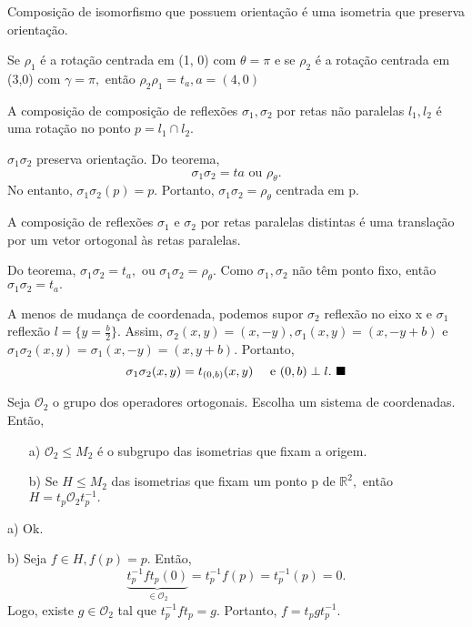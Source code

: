 \documentclass[Algebra/algebra_notes.tex]{subfiles}
\begin{document}
\begin{proof*}
	Composição de isomorfismo que possuem orientação é uma isometria que preserva orientação.
\end{proof*}
\begin{example*}
	Se $\rho _{1}$ é a rotação centrada em (1, 0) com $\theta = \pi $ e se $\rho _{2}$ é a rotação centrada em (3,0) com
	$\gamma =\pi ,$ então $\rho _{2}\rho _{1}=t_{a}, a = (4, 0)$ \qedsymbol
\end{example*}
\begin{crl*}
	A composição de composição de reflexões $\sigma _{1}, \sigma _{2}$ por retas não paralelas $l_{1}, l_{2}$ é uma rotação no ponto
	$p=l_{1}\cap l_{2}.$
\end{crl*}
\begin{proof*}
	$\sigma_{1}\sigma _{2}$ preserva orientação. Do teorema,
	$$
		\sigma _{1}\sigma _{2} = ta\text{ ou } \rho _{\theta }.
	$$
	No entanto, $\sigma _{1}\sigma _{2}(p) = p.$ Portanto, $\sigma _{1}\sigma _{2} = \rho _{\theta }$ centrada em p. \qedsymbol
\end{proof*}
\begin{crl*}
	A composição de reflexões $\sigma _{1}$ e $\sigma _{2}$ por retas paralelas distintas é uma translação por um vetor ortogonal
	às retas paralelas.
\end{crl*}
\begin{proof*}
	Do teorema, $\sigma _{1}\sigma _{2} = t_{a},$ ou $\sigma _{1}\sigma _{2} = \rho _{\theta }.$ Como $\sigma _{1}, \sigma _{2}$
	não têm ponto fixo, então $\sigma _{1}\sigma _{2} = t_{a}.$

	A menos de mudança de coordenada, podemos supor $\sigma _{2}$ reflexão no eixo x e $\sigma _{1}$ reflexão $l=\{y=\frac{b}{2}\}.$ Assim,
	$\sigma _{2}(x, y) = (x, -y), \sigma _{1}(x,y) = (x, -y+b)$ e $\sigma _{1}\sigma _{2}(x, y)=\sigma _{1}(x, -y) = (x, y+b).$ Portanto,
	$$
		\sigma _{1}\sigma _{2}(x,y) = t_{(0, b)}(x,y)\quad\text{ e }(0,b)\perp l.\text{ $\blacksquare$}
	$$
\end{proof*}
\begin{prop*}
	Seja $\mathcal{O}_{2}$ o grupo dos operadores ortogonais. Escolha um sistema de coordenadas. Então,
	\begin{itemize}
		\item[a)] $\mathcal{O}_{2}\leq M_{2}$ é o subgrupo das isometrias que fixam a origem.
		\item[b)] Se $H\leq M_{2}$ das isometrias que fixam um ponto p de $\mathbb{R}^{2},$ então $H = t_{p}\mathcal{O}_{2}t_{p}^{-1}.$
	\end{itemize}
\end{prop*}
\begin{proof*}
	a) Ok.

	b) Seja $f\in H, f(p) = p.$ Então,
	$$
		\underbrace{t_{p}^{-1}ft_{p}(0)}_{\in \mathcal{O}_{2}} = t_{p}^{-1}f(p) = t_{p}^{-1}(p) = 0.
	$$
	Logo, existe $g\in \mathcal{O}_{2}$ tal que $t_{p}^{-1}ft_{p} = g.$ Portanto, $f = t_{p}gt_{p}^{-1}.$ \qedsymbol
\end{proof*}
\end{document}
